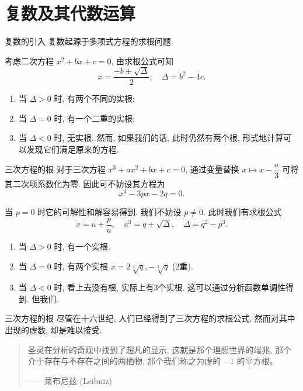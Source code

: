 \section{复数及其代数运算}


\begin{frame}{复数的引入}
\onslide<+->
复数起源于多项式方程的求根问题.

\onslide<+->
考虑二次方程 $x^2+bx+c=0$, 由求根公式可知
\[x=\frac{-b\pm\sqrt\Delta}2,\quad \Delta=b^2-4c.\]
\vspace{-\baselineskip}
\begin{enumerate}
\item 当 $\Delta>0$ 时, 有两个不同的实根;
\item 当 $\Delta=0$ 时, 有一个二重的实根;
\item 当 $\Delta<0$ 时, 无实根.
\onslide<+->
然而, 如果我们的话, 此时仍然有两个根, 形式地计算可以发现它们满足原来的方程.
\end{enumerate}
\end{frame}


\begin{frame}{三次方程的根}
\onslide<+->
对于三次方程 $x^3+ax^2+bx+c=0$,
\onslide<+->
通过变量替换 $x\mapsto x-\dfrac a3$ 可将其二次项系数化为零.
\onslide<+->
因此可不妨设其方程为
\[x^3-3px-2q=0.\]

\onslide<+->
当 $p=0$ 时它的可解性和解容易得到.
\onslide<+->
我们不妨设 $p\neq0$.
\onslide<+->
此时我们有求根公式
\[x=u+\frac pu,\quad u^3=q+\sqrt{\Delta},\quad \Delta=q^2-p^3.\]
\vspace{-\baselineskip}
\begin{enumerate}
\item 当 $\Delta>0$ 时, 有一个实根.
\item 当 $\Delta=0$ 时, 有两个实根 $x=2\sqrt[3]q,-\sqrt[3]q$ ($2$重).
\item 当 $\Delta<0$ 时, 看上去没有根, 实际上有3个实根. 这可以通过分析函数单调性得到.
\onslide<+->
但我们.
\end{enumerate}
\end{frame}


\begin{frame}{三次方程的根}
\onslide<+->
尽管在十六世纪, 人们已经得到了三次方程的求根公式, 然而对其中出现的虚数, 却是难以接受.

\vspace{\baselineskip}
\begin{quote}
圣灵在分析的奇观中找到了超凡的显示, 这就是那个理想世界的端兆, 那个介于存在与不存在之间的两栖物, 那个我们称之为虚的 $−1$ 的平方根。
\begin{flushright}
——莱布尼兹 (Leibniz)
\end{flushright}
\end{quote}
\end{frame}


